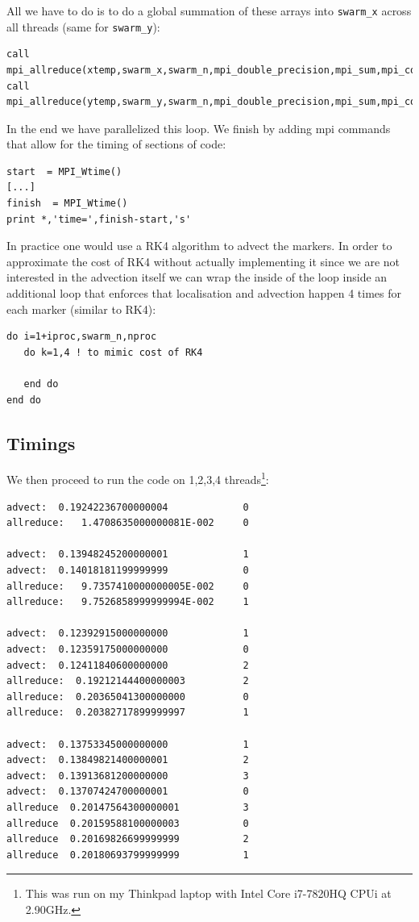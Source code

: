 All we have to do is to do a global summation of these arrays into \verb|swarm_x| across 
all threads (same for \verb|swarm_y|):
\begin{verbatim}
call mpi_allreduce(xtemp,swarm_x,swarm_n,mpi_double_precision,mpi_sum,mpi_comm_world,ierr)
call mpi_allreduce(ytemp,swarm_y,swarm_n,mpi_double_precision,mpi_sum,mpi_comm_world,ierr)
\end{verbatim}
In the end we have parallelized this loop. We finish by adding 
mpi commands that allow for the timing of sections of code:
\begin{verbatim}
start  = MPI_Wtime()
[...]
finish  = MPI_Wtime()
print *,'time=',finish-start,'s'
\end{verbatim}
In practice one would use a RK4 algorithm to advect the markers. 
In order to approximate the cost of RK4 without actually implementing it since 
we are not interested in the advection itself we can wrap the inside of the loop 
inside an additional loop that enforces that localisation and advection happen 
4 times for each marker (similar to RK4):
\begin{verbatim}
do i=1+iproc,swarm_n,nproc
   do k=1,4 ! to mimic cost of RK4

   end do
end do
\end{verbatim}

\subsection*{Timings}

We then proceed to run the code on 1,2,3,4 threads\footnote{This 
was run on my Thinkpad laptop with Intel Core i7-7820HQ CPUi at 2.90GHz.}:

\begin{verbatim}
advect:  0.19242236700000004             0
allreduce:   1.4708635000000081E-002     0

advect:  0.13948245200000001             1
advect:  0.14018181199999999             0
allreduce:   9.7357410000000005E-002     0
allreduce:   9.7526858999999994E-002     1

advect:  0.12392915000000000             1
advect:  0.12359175000000000             0
advect:  0.12411840600000000             2
allreduce:  0.19212144400000003          2
allreduce:  0.20365041300000000          0
allreduce:  0.20382717899999997          1

advect:  0.13753345000000000             1
advect:  0.13849821400000001             2
advect:  0.13913681200000000             3
advect:  0.13707424700000001             0
allreduce  0.20147564300000001           3
allreduce  0.20159588100000003           0
allreduce  0.20169826699999999           2
allreduce  0.20180693799999999           1
\end{verbatim}

